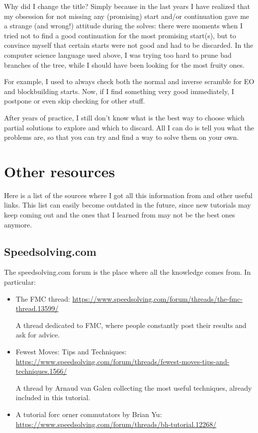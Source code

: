 \documentclass[11pt,a4paper]{book}
\begin{document}
\bigskip
Why did I change the title? Simply because in the last years I have realized that my obsession for not missing any (promising) start and/or continuation gave me a strange (and wrong!) attitude during the solves: there were moments when I tried not to find a good continuation for the most promising start(s), but to convince myself that certain starts were not good and had to be discarded. In the computer science language used above, I was trying too hard to prune bad branches of the tree, while I should have been looking for the most fruity ones.

For example, I used to always check both the normal and inverse scramble for EO and blockbuilding starts. Now, if I find something very good immediately, I postpone or even skip checking for other stuff.

After years of practice, I still don't know what is the best way to choose which partial solutions to explore and which to discard. All I can do is tell you what the problems are, so that you can try and find a way to solve them on your own.

\appendix

\chapter{Other resources}
\label{other_sources}

Here is a list of the sources where I got all this information from and other useful links. This list can easily become outdated in the future, since new tutorials may keep coming out and the ones that I learned from may not be the best ones anymore.

\section*{Speedsolving.com}

The speedsolving.com forum is the place where all the knowledge comes from. In particular:

\begin{itemize}
\item The FMC thread: \url{https://www.speedsolving.com/forum/threads/the-fmc-thread.13599/}

A thread dedicated to FMC, where people constantly post their results and ask for advice.
\item Fewest Moves: Tips and Techniques: \url{https://www.speedsolving.com/forum/threads/fewest-moves-tips-and-techniques.1566/}

A thread by Arnaud van Galen collecting the most useful techniques, already included in this tutorial.

\item A tutorial forc orner commutators by Brian Yu: \url{https://www.speedsolving.com/forum/threads/bh-tutorial.12268/}
\end{itemize}
\end{document}
